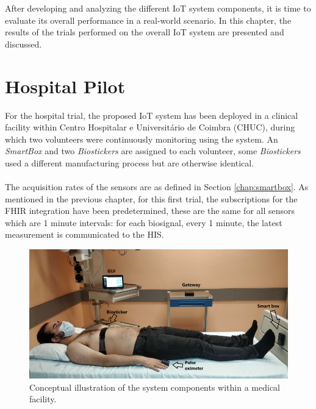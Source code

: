 

After developing and analyzing the different \acs{IoT} system components, it is time to evaluate its overall performance in a real-world scenario. In this chapter, the results of the trials performed on the overall \acs{IoT} system are presented and discussed. 

\paragraph{} 

\section{Hospital Pilot}

For the hospital trial, the proposed \acs{IoT} system has been deployed in a clinical facility within Centro Hospitalar e Universitário de Coimbra (CHUC), during which two volunteers were continuously monitoring using the system. An \textit{SmartBox} and two \textit{Biostickers} are assigned to each volunteer, some \textit{Biostickers} used a different manufacturing process but are otherwise identical.

\paragraph{} The acquisition rates of the sensors are as defined in Section \ref{chap:smartbox}. As mentioned in the previous chapter, for this first trial, the subscriptions for the \acs{FHIR} integration have been predetermined, these are the same for all sensors which are 1 minute intervals: for each biosignal, every 1 minute, the latest measurement is communicated to the \acs{HIS}.  

\begin{figure}[H]
    \centering
    \includegraphics[width=\linewidth]{images/hospital-trial.png}
    \caption[Conceptual illustration of the system components within a medical facility.]{Conceptual illustration of the system components within a medical facility.}
    \label{fig:hospital-trial}
\end{figure}

